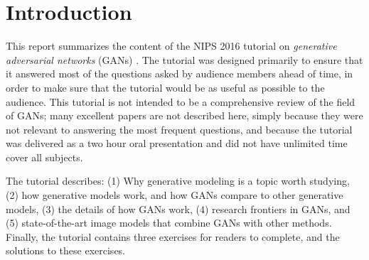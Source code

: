 \section{Introduction}
\label{sec:introduction}

This report summarizes the content of the NIPS 2016 tutorial on {\em generative adversarial networks}
(GANs) \citep{Goodfellow-et-al-NIPS2014-small}.
The tutorial was designed primarily to ensure that it answered most of
the questions asked by audience members ahead of time, in order to make sure
that the tutorial would be as useful as possible to the audience.
This tutorial is not intended to be a comprehensive review of the field
of GANs; many excellent papers are not described here, simply because
they were not relevant to answering the most frequent questions, and because
the tutorial was delivered as a two hour oral presentation and did not
have unlimited time cover all subjects.

The tutorial describes:
(1) Why generative modeling is a topic worth studying,
(2) how generative models work, and how GANs compare to other generative models,
(3) the details of how GANs work,
(4) research frontiers in GANs, and
(5) state-of-the-art image models that combine GANs with other methods.
Finally, the tutorial contains three exercises for readers to complete,
and the solutions to these exercises.

